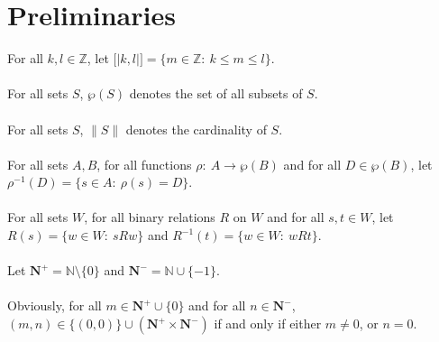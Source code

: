 \documentclass[draft]{article}
\newtheorem{lemma}{Lemma}
\def\Z{\mathbb{Z}}
\def\N{\mathbb{N}}
\def\lsem{{\lbrack\mid}}
\def\rsem{{\mid\rbrack}}
\def\id{\mathtt{id}}
\begin{document}
\section{Preliminaries}\label{section:about:preliminaries}
%
%
For all $k,l{\in}\Z$, let $\lsem k,l\rsem{=}\{m{\in}\Z:\ k{\leq}m{\leq}l\}$.
%
%
\\
\\
%
%
For all sets $S$, $\wp(S)$ denotes the set of all subsets of $S$.
%
%
\\
\\
%
%
For all sets $S$, ${\parallel}S{\parallel}$ denotes the cardinality of $S$.
%
%
\\
\\
%
%
For all sets $A,B$, for all functions $\rho:\ A{\longrightarrow}\wp(B)$ and for all $D{\in}\wp(B)$, let $\rho^{{-}1}(D){=}\{s{\in}A:\ \rho(s){=}D\}$.
%
%
\\
\\
%
%
For all sets $W$, for all binary relations $R$ on $W$ and for all $s,t{\in}W$, let $R(s){=}\{w{\in}
%
%
%
%
%
%
%
%
%
%
%
%
$\linebreak$
%
%
%
%
%
%
%
%
%
%
%
%
W:\ s{R}w\}$ and $R^{{-}1}(t){=}\{w{\in}W:\ w{R}t\}$.
%
%
%
%
%
%
%
%
%
%
%
%
%
%
%
%
%
%
%
%
%
%
%
%
%
%
\\
\\
%
%
Let $\mathbf{N}^{+}{=}\N{\setminus}\{0\}$ and $\mathbf{N}^{-}{=}\N{\cup}\{{-}1\}$.
%
%
%
%
%
%
\\
\\
%
%
Obviously, for all $m{\in}\mathbf{N}^{+}{\cup}\{0\}$ and for all $n{\in}\mathbf{N}^{-}$, $(m,n){\in}\{(0,0)\}{\cup}(\mathbf{N}^{+}{\times}\mathbf{N}^{-})$ if and only if either $m{\not=}0$, or $n{=}0$.
\end{document}
